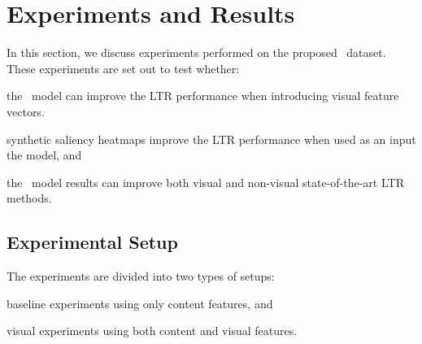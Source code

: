 
%



\section{Experiments and Results}
In this section, we discuss experiments performed on the proposed \datasetname~dataset.
These experiments are set out to test whether:
\begin{inparaenum}[(i)]
\item the \modelname~model can improve the \ac{LTR} performance when introducing visual feature vectors. 
\item synthetic saliency heatmaps improve the \ac{LTR} performance when used as an input the \modelname model, and
\item the \modelname~model results can improve both visual and non-visual state-of-the-art \ac{LTR} methods.
\end{inparaenum}

\subsection{Experimental Setup}
The experiments are divided into two types of setups:
\begin{inparaenum}[(i)]
\item baseline experiments using only content features, and
\item visual experiments using both content and visual features.
\end{inparaenum}

